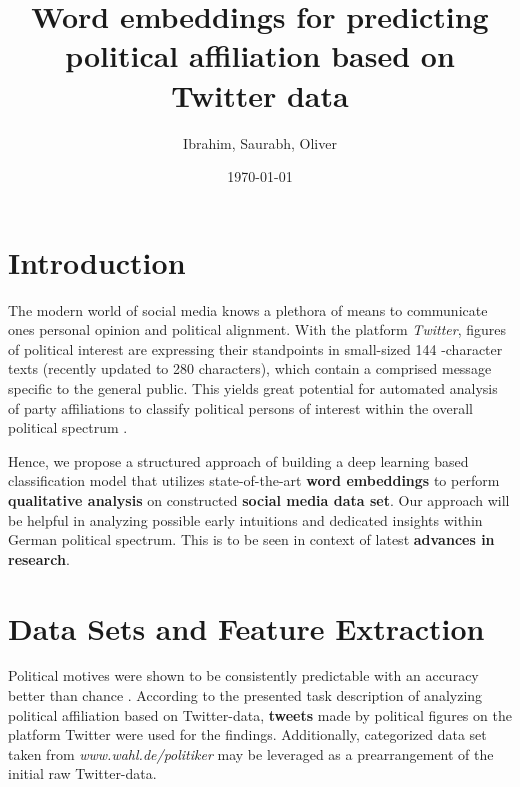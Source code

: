 \documentclass[final]{beamer}
\title
[Machine Learning 1 Conference, Kaiserslautern, Germany ] %
{ %
Word embeddings for predicting political affiliation based on
Twitter data
}
\author{ %
Ibrahim, Saurabh, Oliver
}
\institute
[Technische Universität Kaiserslautern] %
{
\inst{1} Technische Universität Kaiserslautern\\[0.3ex]

}
\date{\today}
\begin{document}
\begin{frame}[t]
\begin{multicols}{3}

\section{Introduction}

The modern world of social media knows a plethora of means to communicate ones personal opinion and political alignment. With the platform \textit{Twitter}, figures of political interest are expressing their standpoints in small-sized 144 -character texts (recently updated to 280 characters), which contain a comprised message specific to the general public. This yields great potential for automated analysis of party affiliations to classify political persons of interest within the overall political spectrum \cite{Biessmann2017}.

Hence, we propose a structured approach of building a deep learning based classification model that utilizes state-of-the-art \textbf{word embeddings} \cite{Pelevinala2016} to perform \textbf{qualitative analysis} on constructed \textbf{social media data set}. Our approach will be helpful in analyzing possible early intuitions and dedicated insights within German political spectrum.
This is to be seen in context of latest \textbf{advances in research}.



\section{Data Sets and Feature Extraction}

Political motives were shown to be consistently predictable with an accuracy better than chance \cite{Biessmann2017}.
According to the presented task description of analyzing political affiliation based on Twitter-data, \textbf{tweets} made by political figures on the platform Twitter were used for the findings.
Additionally, categorized data set taken from \textit{www.wahl.de/politiker} may be leveraged as a prearrangement of the initial raw Twitter-data.


\end{multicols}
\end{frame}
\end{document}
